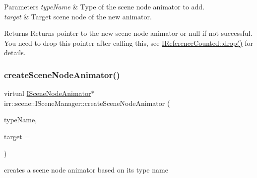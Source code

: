 \begin{DoxyParams}{Parameters}
{\em type\+Name} & Type of the scene node animator to add. \\
\hline
{\em target} & Target scene node of the new animator. \\
\hline
\end{DoxyParams}
\begin{DoxyReturn}{Returns}
Returns pointer to the new scene node animator or null if not successful. You need to drop this pointer after calling this, see \hyperlink{classirr_1_1IReferenceCounted_a03856a09355b89d178090c4a5f738543}{I\+Reference\+Counted\+::drop()} for details. 
\end{DoxyReturn}
\mbox{\label{classirr_1_1scene_1_1ISceneManager_ac63c38a05b8e7d0a11ddb1752da36835}} 
\subsubsection{\texorpdfstring{create\+Scene\+Node\+Animator()}{createSceneNodeAnimator()}\hspace{0.1cm}{\footnotesize\ttfamily [2/2]}}
{\footnotesize\ttfamily virtual \hyperlink{classirr_1_1scene_1_1ISceneNodeAnimator}{I\+Scene\+Node\+Animator}$\ast$ irr\+::scene\+::\+I\+Scene\+Manager\+::create\+Scene\+Node\+Animator (\begin{DoxyParamCaption}\item[{const char $\ast$}]{type\+Name,  }\item[{\hyperlink{classirr_1_1scene_1_1ISceneNode}{I\+Scene\+Node} $\ast$}]{target = {} }\end{DoxyParamCaption})\hspace{0.3cm}{\ttfamily [pure virtual]}}



creates a scene node animator based on its type name 


